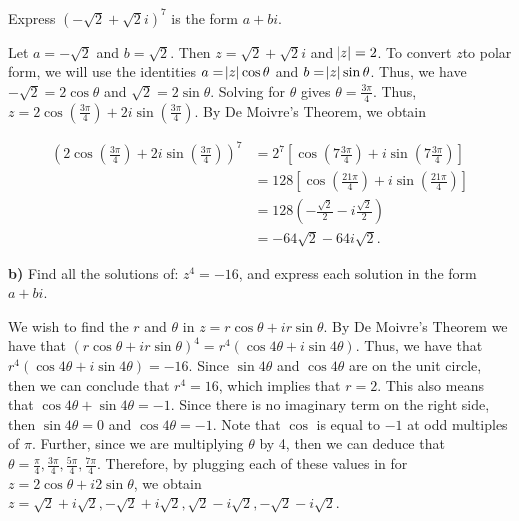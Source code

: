\documentclass[12pt, a4paper]{article}
\begin{document}
\begin{addmargin}[2.8em]{2.8em}
    \vspace{2mm}
    
    \noindent Express $(-\sqrt{2}+\sqrt{2}i)^7$ is the form $a+bi$.
    
    \vspace{4mm}
    
    \noindent Let $a=-\sqrt{2}$ and $b=\sqrt{2}$. Then $z=\sqrt{2}+\sqrt{2}i$ and $\abs{z}=2$. To convert $z$\newpage\noindent to polar form, we will use the identities $a=\abs{z}\cos{\theta}$ and $b=\abs{z}\sin{\theta}$. Thus, we have $-\sqrt{2}=2\cos{\theta}$ and $\sqrt{2}=2\sin{\theta}$. Solving for $\theta$ gives $\theta=\frac{3\pi}{4}$. Thus, $z=2\cos{(\frac{3\pi}{4})}+2i\sin{(\frac{3\pi}{4})}$. By De Moivre's Theorem, we obtain
    
    \begin{equation*}
        \begin{split}
            (2\cos{(\frac{3\pi}{4})}+2i\sin{(\frac{3\pi}{4})})^7& =2^7[\cos{(7\frac{3\pi}{4})}+i\sin{(7\frac{3\pi}{4})}] \\
            & =128[\cos{(\frac{21\pi}{4})}+i\sin{(\frac{21\pi}{4})}] \\
            & =128(-\frac{\sqrt{2}}{2}-i\frac{\sqrt{2}}{2}) \\
            & =-64\sqrt{2}-64i\sqrt{2}.
        \end{split}
    \end{equation*}

\end{addmargin}

\vspace{2mm}

\par\textbf{b)} Find all the solutions of: $z^4=-16$, and express each solution in the form $a+bi$.

\vspace{4mm}

\begin{addmargin}[2.8em]{2.8em}

    \noindent We wish to find the $r$ and $\theta$ in $z=r\cos{\theta}+ir\sin{\theta}$. By De Moivre's Theorem we have that $(r\cos{\theta}+ir\sin{\theta})^4=r^4(\cos{4\theta}+i\sin{4\theta})$. Thus, we have that $r^4(\cos{4\theta}+i\sin{4\theta})=-16$. Since $\sin{4\theta}$ and $\cos{4\theta}$ are on the unit circle, then we can conclude that $r^4=16$, which implies that $r=2$. This also means that $\cos{4\theta}+\sin{4\theta}=-1$. Since there is no imaginary term on the right side, then $\sin{4\theta}=0$ and $\cos{4\theta}=-1$. Note that $\cos$ is equal to $-1$ at odd multiples of $\pi$. Further, since we are multiplying $\theta$ by 4, then we can deduce that $\theta=\frac{\pi}{4},\frac{3\pi}{4},\frac{5\pi}{4},\frac{7\pi}{4}$. Therefore, by plugging each of these values in for $z=2\cos{\theta}+i2\sin{\theta}$, we obtain $z=\sqrt{2}+i\sqrt{2}, -\sqrt{2}+i\sqrt{2}, \sqrt{2}-i\sqrt{2}, -\sqrt{2}-i\sqrt{2}$.

\end{addmargin}
\end{document}
